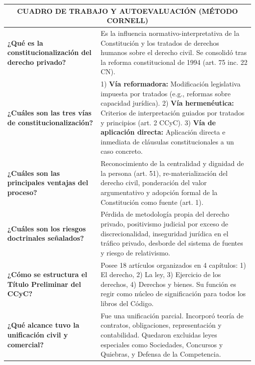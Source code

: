 \documentclass[12pt,oneside]{book}
\begin{document}
\begin{center}
\begin{longtable}{|p{4.5cm}|p{10.5cm}|}
\hline
\multicolumn{2}{|c|}{\textbf{CUADRO DE TRABAJO Y AUTOEVALUACIÓN (MÉTODO CORNELL)}} \\
\hline
\endhead
\hline
\endfoot

\textbf{¿Qué es la constitucionalización del derecho privado?} & 
Es la influencia normativo-interpretativa de la Constitución y los tratados de derechos humanos sobre el derecho civil. Se consolidó tras la reforma constitucional de 1994 (art. 75 inc. 22 CN). \\ \hline

\textbf{¿Cuáles son las tres vías de constitucionalización?} & 
1) \textbf{Vía reformadora:} Modificación legislativa impuesta por tratados (e.g., reformas sobre capacidad jurídica). 
2) \textbf{Vía hermenéutica:} Criterios de interpretación guiados por tratados y principios (art. 2 CCyC). 
3) \textbf{Vía de aplicación directa:} Aplicación directa e inmediata de cláusulas constitucionales a un caso concreto. \\ \hline

\textbf{¿Cuáles son las principales ventajas del proceso?} & 
Reconocimiento de la centralidad y dignidad de la persona (art. 51), re-materialización del derecho civil, ponderación del valor argumentativo y adopción formal de la Constitución como fuente (art. 1). \\ \hline

\textbf{¿Cuáles son los riesgos doctrinales señalados?} & 
Pérdida de metodología propia del derecho privado, positivismo judicial por exceso de discrecionalidad, inseguridad jurídica en el tráfico privado, desborde del sistema de fuentes y riesgo de relativismo. \\ \hline

\textbf{¿Cómo se estructura el Título Preliminar del CCyC?} & 
Posee 18 artículos organizados en 4 capítulos: 1) El derecho, 2) La ley, 3) Ejercicio de los derechos, 4) Derechos y bienes. Su función es regir como núcleo de significación para todos los libros del Código. \\ \hline

\textbf{¿Qué alcance tuvo la unificación civil y comercial?} & 
Fue una unificación parcial. Incorporó teoría de contratos, obligaciones, representación y contabilidad. Quedaron excluidas leyes especiales como Sociedades, Concursos y Quiebras, y Defensa de la Competencia. \\ \hline


\end{longtable}
\end{center}
\end{document}
